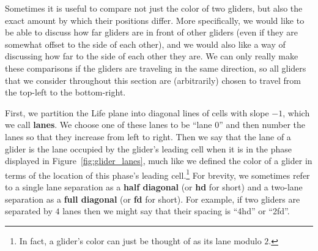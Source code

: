 Sometimes it is useful to compare not just the color of two gliders, but also the exact amount by which their positions differ. More specifically, we would like to be able to discuss how far gliders are in front of other gliders (even if they are somewhat offset to the side of each other), and we would also like a way of discussing how far to the side of each other they are. We can only really make these comparisons if the gliders are traveling in the same direction, so all gliders that we consider throughout this section are (arbitrarily) chosen to travel from the top-left to the bottom-right.

First, we partition the Life plane into diagonal lines of cells with slope $-1$, which we call \textbf{lanes}. We choose one of these lanes to be ``lane $0$'' and then number the lanes so that they increase from left to right. Then we say that the lane of a glider is the lane occupied by the glider's leading cell when it is in the phase displayed in Figure~\ref{fig:glider_lanes}, much like we defined the color of a glider in terms of the location of this phase's leading cell.\footnote{In fact, a glider's color can just be thought of as its lane modulo $2$.} For brevity, we sometimes refer to a single lane separation as a \textbf{half diagonal} (or \textbf{hd} for short) and a two-lane separation as a \textbf{full diagonal} (or \textbf{fd} for short). For example, if two gliders are separated by $4$ lanes then we might say that their spacing is ``4hd'' or ``2fd''.

